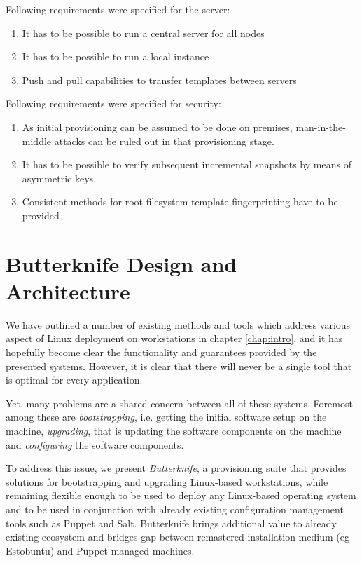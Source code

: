 \documentclass[a4paper,11pt]{kth-mag}
\begin{document}
\noindent Following requirements were specified for the server:

\begin{enumerate}
\item It has to be possible to run a central server for all nodes
\item It has to be possible to run a local instance
\item Push and pull capabilities to transfer templates between servers
\end{enumerate}

\noindent Following requirements were specified for security:

\begin{enumerate}
\item As initial provisioning can be assumed to be done on premises,
man-in-the-middle attacks can be ruled out in that
provisioning stage.
\item It has to be possible to verify subsequent incremental snapshots by means of asymmetric keys.
\item Consistent methods for root filesystem template fingerprinting have to be provided
\end{enumerate}


%
%
%
%
\chapter{Butterknife Design and Architecture}
\label{chap:design}
We have outlined a number of existing methods and tools
which address various aspect of Linux deployment on workstations
in chapter \ref{chap:intro}, and it has hopefully become clear
the functionality and guarantees provided by the presented systems.
However, it is clear that there will never be a single tool
that is optimal for every application.

Yet, many problems are a shared concern between all of these systems.
Foremost among these are \emph{bootstrapping}, i.e. getting
the initial software setup on the machine,
\emph{upgrading}, that is updating the software components on the machine and
\emph{configuring} the software components.

To address this issue, we present \emph{Butterknife},
a provisioning suite that provides solutions for bootstrapping and
upgrading Linux-based workstations, while remaining flexible enough
to be used to deploy any Linux-based operating system
and to be used in conjunction with already existing
configuration management tools such as Puppet and Salt.
Butterknife brings additional value to already existing
ecosystem and bridges gap between remastered installation medium
(eg Estobuntu) and Puppet managed machines.
\end{document}
